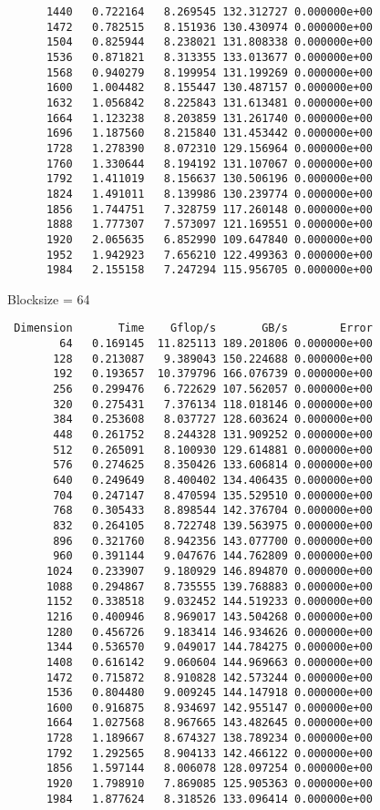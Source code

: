 \documentclass{article}
\begin{document}
\begin{enumerate}
\begin{verbatim}
      1440   0.722164   8.269545 132.312727 0.000000e+00
      1472   0.782515   8.151936 130.430974 0.000000e+00
      1504   0.825944   8.238021 131.808338 0.000000e+00
      1536   0.871821   8.313355 133.013677 0.000000e+00
      1568   0.940279   8.199954 131.199269 0.000000e+00
      1600   1.004482   8.155447 130.487157 0.000000e+00
      1632   1.056842   8.225843 131.613481 0.000000e+00
      1664   1.123238   8.203859 131.261740 0.000000e+00
      1696   1.187560   8.215840 131.453442 0.000000e+00
      1728   1.278390   8.072310 129.156964 0.000000e+00
      1760   1.330644   8.194192 131.107067 0.000000e+00
      1792   1.411019   8.156637 130.506196 0.000000e+00
      1824   1.491011   8.139986 130.239774 0.000000e+00
      1856   1.744751   7.328759 117.260148 0.000000e+00
      1888   1.777307   7.573097 121.169551 0.000000e+00
      1920   2.065635   6.852990 109.647840 0.000000e+00
      1952   1.942923   7.656210 122.499363 0.000000e+00
      1984   2.155158   7.247294 115.956705 0.000000e+00
    \end{verbatim}

    Blocksize = 64
    \begin{verbatim}
 Dimension       Time    Gflop/s       GB/s        Error
        64   0.169145  11.825113 189.201806 0.000000e+00
       128   0.213087   9.389043 150.224688 0.000000e+00
       192   0.193657  10.379796 166.076739 0.000000e+00
       256   0.299476   6.722629 107.562057 0.000000e+00
       320   0.275431   7.376134 118.018146 0.000000e+00
       384   0.253608   8.037727 128.603624 0.000000e+00
       448   0.261752   8.244328 131.909252 0.000000e+00
       512   0.265091   8.100930 129.614881 0.000000e+00
       576   0.274625   8.350426 133.606814 0.000000e+00
       640   0.249649   8.400402 134.406435 0.000000e+00
       704   0.247147   8.470594 135.529510 0.000000e+00
       768   0.305433   8.898544 142.376704 0.000000e+00
       832   0.264105   8.722748 139.563975 0.000000e+00
       896   0.321760   8.942356 143.077700 0.000000e+00
       960   0.391144   9.047676 144.762809 0.000000e+00
      1024   0.233907   9.180929 146.894870 0.000000e+00
      1088   0.294867   8.735555 139.768883 0.000000e+00
      1152   0.338518   9.032452 144.519233 0.000000e+00
      1216   0.400946   8.969017 143.504268 0.000000e+00
      1280   0.456726   9.183414 146.934626 0.000000e+00
      1344   0.536570   9.049017 144.784275 0.000000e+00
      1408   0.616142   9.060604 144.969663 0.000000e+00
      1472   0.715872   8.910828 142.573244 0.000000e+00
      1536   0.804480   9.009245 144.147918 0.000000e+00
      1600   0.916875   8.934697 142.955147 0.000000e+00
      1664   1.027568   8.967665 143.482645 0.000000e+00
      1728   1.189667   8.674327 138.789234 0.000000e+00
      1792   1.292565   8.904133 142.466122 0.000000e+00
      1856   1.597144   8.006078 128.097254 0.000000e+00
      1920   1.798910   7.869085 125.905363 0.000000e+00
      1984   1.877624   8.318526 133.096414 0.000000e+00
    \end{verbatim}


\end{enumerate}
\end{document}
